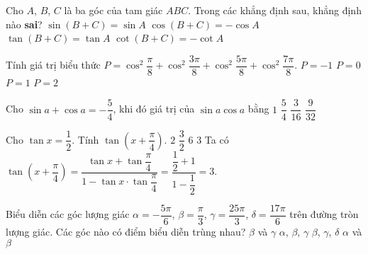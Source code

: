 \begin{ex}%
	Cho $A$, $B$, $C$ là ba góc của tam giác $ABC$. Trong các khẳng định sau, khẳng định nào \textbf{sai}?
	\choice
	{$\sin (B+C)=\sin A$}
	{$\cos (B+C)=-\cos A$}
	{\True $\tan (B+C)=\tan A$}
	{$\cot (B+C)=-\cot A$}
\end{ex}
\begin{ex}%
	Tính giá trị biểu thức $P=\cos ^2\dfrac{\pi}{8}+\cos ^2\dfrac{{3\pi}}{8}+\cos ^2\dfrac{{5\pi}}{8}+\cos ^2\dfrac{{7\pi}}{8}.$
	\choice
	{$P=-1$}
	{$P=0$}
	{$P=1$}
	{\True $P=2$}
\end{ex}
\begin{ex}%
	Cho $\sin a + \cos a = - \dfrac 54$, khi đó giá trị của $\sin a \cos a$ bằng
	\choice
	{$1$}
	{$\dfrac{5}{4}$}
	{$\dfrac{3}{16}$}
	{\True $\dfrac{9}{32}$}
\end{ex}
\begin{ex}%
	Cho $\tan x=\dfrac{1}{2}$. Tính $\tan \left(x+\dfrac{\pi}{4}\right)$.
	\choice
	{$2$}
	{$\dfrac{3}{2}$}
	{$6$}
	{\True $3$}
	\loigiai
	{
		Ta có $\tan \left(x+\dfrac{\pi}{4}\right)=\dfrac{\tan x+\tan \dfrac{\pi}{4}}{1-\tan x\cdot \tan \dfrac{\pi}{4}}=\dfrac{\dfrac{1}{2}+1}{1-\dfrac{1}{2}} = 3$.
	}
\end{ex}
\begin{ex}%
	Biểu diễn các góc lượng giác $\alpha=-\dfrac{5\pi}{6}$, $\beta=\dfrac{\pi}{3}$, $\gamma=\dfrac{25\pi}{3}$, $\delta=\dfrac{17\pi}{6}$ trên đường tròn lượng giác. Các góc nào có điểm biểu diễn trùng nhau?
	\choice
	{\True $\beta$ và $\gamma$}
	{$\alpha$, $\beta$, $\gamma$}
	{$\beta$, $\gamma$, $\delta$}
	{$\alpha$ và $\beta$}
\end{ex}
